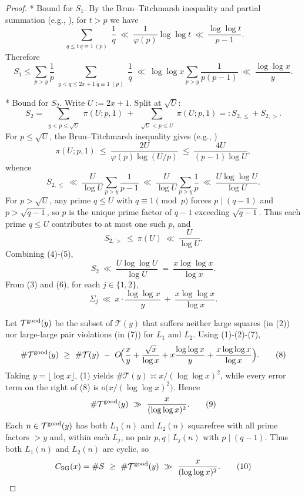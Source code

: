 \begin{proof}
* Bound for $S_1$. By the Brun--Titchmarsh inequality and partial summation (e.g., \cite{MV2007,IK2004}), for $t>p$ we have
$$\sum_{\substack{q\le t\ q\equiv1\ (p)}}\frac{1}{q}\ \ll\ \frac{1}{\varphi(p)}\log\log t\ \ll\ \frac{\log\log t}{p-1}.$$
Therefore
$$S_1\le \sum_{p>y}\frac{1}{p}\sum_{\substack{y<q\le 2x+1\ q\equiv1\ (p)}}\frac{1}{q}\ \ll\ \log\log x\sum_{p>y}\frac{1}{p(p-1)}\ \ll\ \frac{\log\log x}{y}.\tag{3}$$

* Bound for $S_2$. Write $U:=2x+1$. Split at $\sqrt U$:
\[S_2=\sum_{\substack{y<p\le\sqrt U}}\pi(U;p,1)\ +\ \sum_{\substack{\sqrt U<p\le U}}\pi(U;p,1)=:S_{2,\le}+S_{2,>}.
\]
For $p\le\sqrt U$, the Brun--Titchmarsh inequality gives (e.g., \cite{MV2007,IK2004})
$$\pi(U;p,1)\ \le\ \frac{2U}{\varphi(p)\log(U/p)}\ \le\ \frac{4U}{(p-1)\log U},$$
whence
$$S_{2,\le}\ \ll\ \frac{U}{\log U}\sum_{p>y}\frac{1}{p-1}\ \ll\ \frac{U}{\log U}\sum_{p>y}\frac{1}{p}\ \ll\ \frac{U\log\log U}{\log U}.\tag{4}$$
For $p>\sqrt U$, any prime $q\le U$ with $q\equiv1\pmod p$ forces $p\mid(q-1)$ and $p>\sqrt{q-1}$, so $p$ is the unique prime factor of $q-1$ exceeding $\sqrt{q-1}$. Thus each prime $q\le U$ contributes to at most one such $p$, and
$$S_{2,>}\ \le\ \pi(U)\ \ll\ \frac{U}{\log U}.\tag{5}$$
Combining (4)-(5),
$$S_2\ \ll\ \frac{U\log\log U}{\log U}\ =\ \frac{x\log\log x}{\log x}.\tag{6}$$
From (3) and (6), for each $j\in\{1,2\}$,
$$\Sigma_j\ \ll\ x\cdot\frac{\log\log x}{y}\ +\ \frac{x\log\log x}{\log x}.\tag{7}$$

Let $\mathcal T^{\rm good}(y)$ be the subset of $\mathcal T(y)$ that suffers neither large squares (in (2)) nor large-large pair violations (in (7)) for $L_1$ and $L_2$. Using (1)-(2)-(7),
\[\#\mathcal T^{\rm good}(y)\ \ge\ \#\mathcal T(y)\ -\ O\!\Bigl(\frac{x}{y}+\frac{\sqrt{x}}{\log x}+x\frac{\log\log x}{y}+\frac{x\log\log x}{\log x}\Bigr).\tag{8}\]
Taking $y=\lfloor\log x\rfloor$, (1) yields $\#\mathcal T(y)\asymp x/(\log\log x)^2$, while every error term on the right of (8) is $o\bigl(x/(\log\log x)^2\bigr)$. Hence
$$\#\mathcal T^{\rm good}(y)\ \gg\ \frac{x}{(\log\log x)^2}.\tag{9}$$
Each $n\in\mathcal T^{\rm good}(y)$ has both $L_1(n)$ and $L_2(n)$ squarefree with all prime factors $>y$ and, within each $L_j$, no pair $p,q\mid L_j(n)$ with $p\mid(q-1)$. Thus both $L_1(n)$ and $L_2(n)$ are cyclic, so
$$C_{\mathrm{SG}}(x)=\#S\ \ge\ \#\mathcal T^{\rm good}(y)\ \gg\ \frac{x}{(\log\log x)^2}.\tag{10}$$


\end{proof}
